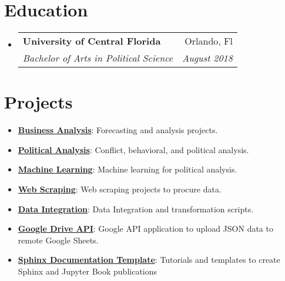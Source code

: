 \documentclass[letterpaper,11pt]{article}
\makeatletter
\newcommand{\resumeItem}[2]{
  \item\small{
    \textbf{#1}{: #2 \vspace{-2pt}}
  }
}
\newcommand{\resumeSubheading}[4]{
  \vspace{-1pt}\item
    \begin{tabular*}{0.97\textwidth}[t]{l@{\extracolsep{\fill}}r}
      \textbf{#1} & #2 \\
      \textit{\small#3} & \textit{\small #4} \\
    \end{tabular*}\vspace{-5pt}
}
\newcommand{\resumeSubItem}[2]{\resumeItem{#1}{#2}\vspace{-4pt}}
\newcommand{\resumeSubHeadingListStart}{\begin{itemize}[leftmargin=*]}
\newcommand{\resumeSubHeadingListEnd}{\end{itemize}}
\makeatother
\begin{document}
 \section{Education}
 \resumeSubHeadingListStart
   \resumeSubheading
     {University of Central Florida}{Orlando, Fl}
     {Bachelor of Arts in Political Science}{August 2018}
 \resumeSubHeadingListEnd

\section{Projects}
  \resumeSubHeadingListStart
    \resumeSubItem{\href{https://docs.jnapolitano.io/parts/analysis/business-analysis/index.html}{Business Analysis}}
      {Forecasting and analysis projects.}
    \resumeSubItem{\href{https://docs.jnapolitano.io/parts/analysis/political-analysis/index.html}{Political Analysis}}
      {Conflict, behavioral, and political analysis.}
    \resumeSubItem{\href{https://docs.jnapolitano.io/parts/ml-ai/index.htmll}{Machine Learning}}
      {Machine learning for political analysis.}
    \resumeSubItem{\href{https://docs.jnapolitano.io/parts/data/web-scraping/index.html}{Web Scraping}}
      {Web scraping projects to procure data.}
    \resumeSubItem{\href{https://docs.jnapolitano.io/parts/data/data-integration/index.html}{Data Integration}}
      {Data Integration and transformation scripts.}
    \resumeSubItem{\href{https://docs.jnapolitano.io/parts/python-development/google/index.html}{Google Drive API}}
      {Google API application to upload JSON data to remote Google Sheets.}
    \resumeSubItem{\href{https://journal.jnapolitano.io/parts/tutorials/sphinx/docs/build-this-site.html}{Sphinx Documentation Template}}
      {Tutorials and templates to create Sphinx and Jupyter Book publications}
  \resumeSubHeadingListEnd


\end{document}
